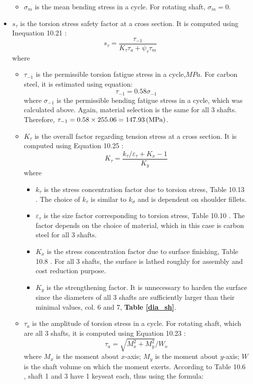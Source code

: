 \begin{itemize}
\begin{itemize}
		\item $ \sigma_m $ is the mean bending stress in a cycle. For rotating shaft, $ \sigma_m = 0 $.
	\end{itemize}
	\item $ s_\tau $ is the torsion stress safety factor at a cross section. It is computed using Inequation 10.21 \cite{tk1}:
	\[
	s_\tau = \dfrac{\tau_{-1}}{K_\tau\tau_a + \psi_\tau\tau_m}
	\]
	where
	\begin{itemize}
		\item $ \tau_{-1} $ is the permissible torsion fatigue stress in a cycle,$ \unit{MPa} $. For carbon steel, it is estimated using equation:
		\[
		\tau_{-1} = 0.58\sigma_{-1}
		\]
		where $ \sigma_{-1} $ is the permissible bending fatigue stress in a cycle, which was calculated above. Again, material selection is the same for all 3 shafts. Therefore, $ \tau_{-1} = 0.58\times 255.06 = 147.93 \, (\mathrm{MPa}) $.
		\item $ K_\tau $ is the overall factor regarding tension stress at a cross section. It is computed using Equation 10.25 \cite{tk1}:
		\[
		K_\tau = \dfrac{k_\tau/\varepsilon_\tau + K_x - 1}{K_y}
		\]
		where
		\begin{itemize}
			\item $ k_\tau $ is the stress concentration factor due to torsion stress, Table 10.13 \cite{tk1}. The choice of $ k_\tau $ is similar to $ k_\sigma $ and is dependent on shoulder fillets.
			\item $ \varepsilon_\tau $ is the size factor corresponding to torsion stress, Table 10.10 \cite{tk1}. The factor depends on the choice of material, which in this case is carbon steel for all 3 shafts.
			\item $ K_x $ is the stress concentration factor due to surface finishing, Table 10.8 \cite{tk1}. For all 3 shafts, the surface is lathed roughly for assembly and cost reduction purpose.
			\item $ K_y $ is the strengthening factor. It is unnecessary to harden the surface since the diameters of all 3 shafts are sufficiently larger than their minimal values, col. 6 and 7, \textbf{Table \ref{dia_sh}}.
		\end{itemize}
		\item $ \tau_a $ is the amplitude of torsion stress in a cycle. For rotating shaft, which are all 3 shafts, it is computed using Equation 10.23 \cite{tk1}:
		\[ \tau_a = \sqrt{M_x^2 + M_y^2}/W_o \]
		where $ M_x $ is the moment about $ x $-axis; $ M_y $ is the moment about $ y $-axis; $ W $ is the shaft volume on which the moment exerts. According to Table 10.6 \cite{tk1}, shaft 1 and 3 have 1 keyseat each, thus using the formula:

\end{itemize}
\end{itemize}
